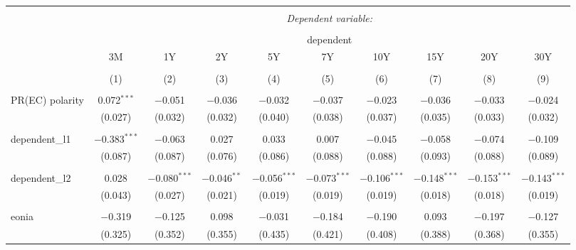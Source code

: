


\begin{table}[!htbp] \centering 
  \caption{} 
  \label{} 
  \begin{adjustbox}{width=1.35\textwidth}
\begin{tabular}{@{\extracolsep{5pt}}lccccccccc} 
\\[-1.8ex]\hline 
\hline \\[-1.8ex] 
 & \multicolumn{9}{c}{\textit{Dependent variable:}} \\ 
\cline{2-10} 
\\[-1.8ex] & \multicolumn{9}{c}{dependent} \\ 
 & 3M & 1Y & 2Y & 5Y & 7Y & 10Y & 15Y & 20Y & 30Y \\ 
\\[-1.8ex] & (1) & (2) & (3) & (4) & (5) & (6) & (7) & (8) & (9)\\ 
\hline \\[-1.8ex] 
 PR(EC) polarity & 0.072$^{***}$ & $-$0.051 & $-$0.036 & $-$0.032 & $-$0.037 & $-$0.023 & $-$0.036 & $-$0.033 & $-$0.024 \\ 
  & (0.027) & (0.032) & (0.032) & (0.040) & (0.038) & (0.037) & (0.035) & (0.033) & (0.032) \\ 
  & & & & & & & & & \\ 
 dependent\_l1 & $-$0.383$^{***}$ & $-$0.063 & 0.027 & 0.033 & 0.007 & $-$0.045 & $-$0.058 & $-$0.074 & $-$0.109 \\ 
  & (0.087) & (0.087) & (0.076) & (0.086) & (0.088) & (0.088) & (0.093) & (0.088) & (0.089) \\ 
  & & & & & & & & & \\ 
 dependent\_l2 & 0.028 & $-$0.080$^{***}$ & $-$0.046$^{**}$ & $-$0.056$^{***}$ & $-$0.073$^{***}$ & $-$0.106$^{***}$ & $-$0.148$^{***}$ & $-$0.153$^{***}$ & $-$0.143$^{***}$ \\ 
  & (0.043) & (0.027) & (0.021) & (0.019) & (0.019) & (0.019) & (0.018) & (0.018) & (0.019) \\ 
  & & & & & & & & & \\ 
 eonia & $-$0.319 & $-$0.125 & 0.098 & $-$0.031 & $-$0.184 & $-$0.190 & 0.093 & $-$0.197 & $-$0.127 \\ 
  & (0.325) & (0.352) & (0.355) & (0.435) & (0.421) & (0.408) & (0.388) & (0.368) & (0.355) \\ 

\end{tabular}
\end{adjustbox}
\end{table}
